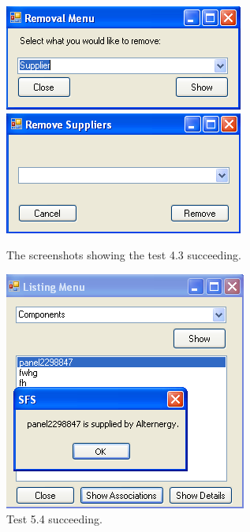 \begin{figure}[ht]
\centering
\includegraphics[scale=0.5]{test4dot3scrot1}
\includegraphics[scale=0.5]{test4dot3scrot2}
\caption{The screenshots showing the test 4.3 succeeding.}
\label{fig:test_fourdotthree}
\end{figure}

\begin{figure}[ht]
\centering
\includegraphics[scale=0.5]{test5dot4scrot}
\caption{Test 5.4 succeeding.}
\label{fig:test_fivedotfour}
\end{figure}

